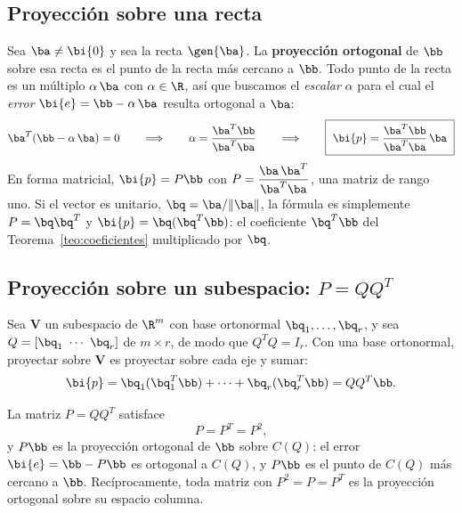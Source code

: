 \subsection*{Proyección sobre una recta}

Sea $\ba\ne\bi{0}$ y sea la recta $\gen\{\ba\}$. La \textbf{proyección
ortogonal} de $\bb$ sobre esa recta es el punto de la recta más cercano a
$\bb$. Todo punto de la recta es un múltiplo $\alpha\,\ba$ con
$\alpha\in\R$, así que buscamos el \emph{escalar} $\alpha$ para el cual el
\emph{error} $\bi{e}=\bb-\alpha\,\ba$ resulta ortogonal a $\ba$:
\[
\ba^T(\bb-\alpha\,\ba)=0
\qquad\Longrightarrow\qquad
\alpha=\frac{\ba^T\bb}{\ba^T\ba}
\qquad\Longrightarrow\qquad
\boxed{\ \bi{p}=\frac{\ba^T\bb}{\ba^T\ba}\,\ba\ }
\]
En forma matricial, $\bi{p}=P\bb$ con
$P=\dfrac{\ba\,\ba^T}{\ba^T\ba}$, una matriz de rango uno. Si el
vector es unitario, $\bq=\ba/\|\ba\|$, la fórmula es simplemente
$P=\bq\bq^T$ y $\bi{p}=\bq(\bq^T\bb)$: el coeficiente
$\bq^T\bb$ del Teorema~\ref{teo:coeficientes} multiplicado por $\bq$.

\subsection*{Proyección sobre un subespacio: $P=QQ^T$}

Sea $\mathbf{V}$ un subespacio de $\R^m$ con base ortonormal
$\bq_1,\dots,\bq_r$, y sea $Q=[\bq_1\ \cdots\ \bq_r]$ de $m\times r$, de modo
que $Q^T Q=I_r$. Con una base ortonormal, proyectar sobre $\mathbf{V}$
es proyectar sobre cada eje y sumar:
\[
\bi{p}=\bq_1(\bq_1^T\bb)+\cdots+\bq_r(\bq_r^T\bb)
=QQ^T\bb .
\]

\begin{teorema}\label{teo:proyector}
La matriz $P=QQ^T$ satisface
\[
P=P^T=P^2 ,
\]
y $P\bb$ es la proyección ortogonal de $\bb$ sobre $C(Q)$: el error
$\bi{e}=\bb-P\bb$ es ortogonal a $C(Q)$, y $P\bb$ es el punto de $C(Q)$ más
cercano a $\bb$. Recíprocamente, toda matriz con $P^2=P=P^T$ es la
proyección ortogonal sobre su espacio columna.
\end{teorema}

